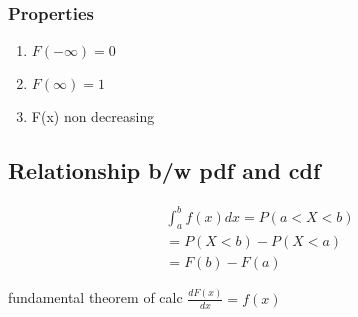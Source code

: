 \documentclass[11pt]{amsart}
\begin{document}
\subsubsection{Properties}
\begin{enumerate}
  \item $F(-\infty) = 0$
  \item $F(\infty) = 1$
  \item F(x) non decreasing
\end{enumerate}
\subsection{Relationship b/w pdf and cdf}

\begin{equation}
  \begin{aligned}
    \int_{a}^{b}f(x) dx = P(a\lt X \lt b)\\
    = P(X \lt b) - P(X \lt a)\\
    = F(b) - F(a)
  \end{aligned}
\end{equation}
\par fundamental theorem of calc $\frac{dF(x)}{dx} = f(x)$
\end{document}

